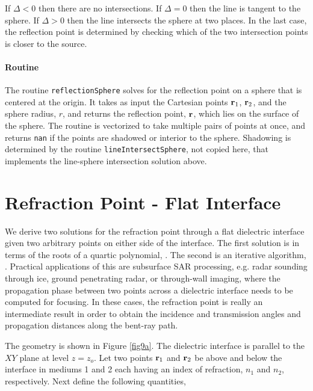 If $\Delta < 0$ then there are no intersections. If $\Delta = 0$ then the line is tangent to the sphere. If $\Delta > 0$ then the line intersects the sphere at two places. In the last case, the reflection point is determined by checking which of the two intersection points is closer to the source.

\paragraph{Routine}
The routine \texttt{reflectionSphere} solves for the reflection point on a sphere that is centered at the origin. It takes as input the Cartesian points $\mathbf{r}_1$, $\mathbf{r}_2$, and the sphere radius, $r$, and returns the reflection point, $\mathbf{r}$, which lies on the surface of the sphere. The routine is vectorized to take multiple pairs of points at once, and returns \texttt{nan} if the points are shadowed or interior to the sphere. Shadowing is determined by the routine \texttt{lineIntersectSphere}, not copied here, that implements the line-sphere intersection solution above. 

{\footnotesize
{}
}


\section{Refraction Point - Flat Interface}

We derive two solutions for the refraction point through a flat dielectric interface given two arbitrary points on either side of the interface. The first solution is in terms of the roots of a quartic polynomial, \cite{heliere2007radio}. The second is an iterative algorithm, \cite{lei20202}. Practical applications of this are subsurface SAR processing, e.g. radar sounding through ice, ground penetrating radar, or through-wall imaging, where the propagation phase between two points across a dielectric interface needs to be computed for focusing. In these cases, the refraction point is really an intermediate result in order to obtain the incidence and transmission angles and propagation distances along the bent-ray path.  

The geometry is shown in Figure \ref{fig9a}. The dielectric interface is parallel to the $XY$ plane at level $z = z_o$. Let two points $\mathbf{r}_1$ and $\mathbf{r}_2$ be above and below the interface in mediums 1 and 2 each having an index of refraction, $n_1$ and $n_2$, respectively. Next define the following quantities, 
 
